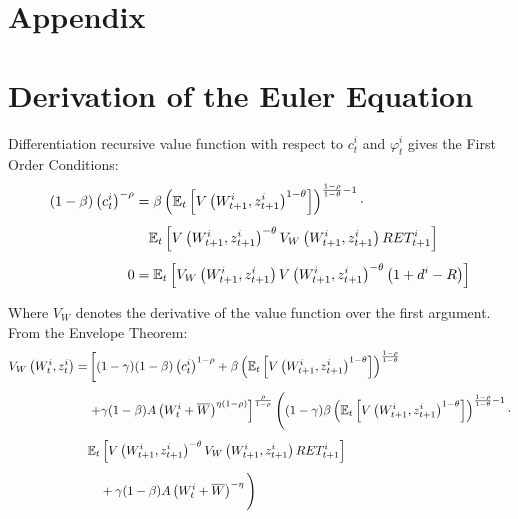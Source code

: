 \documentclass[12pt]{article}
\begin{document}
\printbibliography[title={Bibliography}]

\appendix
\section*{Appendix}
\section{Derivation of the Euler Equation}
\label{app:euler}

Differentiation recursive value function with respect to $c_t^i$ and $\varphi_t^i$ gives the First Order Conditions:
\begin{align}
(1 - \beta) \left(c_t^i\right)^{-\rho} 
&= \beta 
\left( 
    \mathbb{E}_t \left[ V\left(W_{t+1}^i, z_{t+1}^i\right)^{1 - \theta} \right] 
\right)^{\frac{1 - \rho}{1 - \theta} - 1} \cdot \notag \\[1ex]
&\quad 
\mathbb{E}_t \left[ 
    V\left(W_{t+1}^i, z_{t+1}^i\right)^{-\theta} 
    V_W\left(W_{t+1}^i, z_{t+1}^i\right) 
    RET_{t+1}^i 
\right] \label{eq:euler_main} \\[1ex]
0 &= 
\mathbb{E}_t \left[ 
    V_W\left(W_{t+1}^i, z_{t+1}^i\right) 
    V\left(W_{t+1}^i, z_{t+1}^i\right)^{-\theta} 
    \left( 1 + d^i - R \right) 
\right] \label{eq:euler_risky}
\end{align}

Where $V_W$ denotes the derivative of the value function over the first argument. From the Envelope Theorem:
\begin{align}
V_W\left(W_t^i, z_t^i\right) = 
&\left[
    (1 - \gamma)(1 - \beta) \left(c_t^i\right)^{1 - \rho} 
    + \beta 
    \left( \mathbb{E}_t \left[ V\left(W_{t+1}^i, z_{t+1}^i\right)^{1 - \theta} \right] \right)^{\frac{1 - \rho}{1 - \theta}} \right. \notag \\[1ex]
&\left. 
    + \gamma (1 - \beta) A\left(W_t^i + \overline{W}\right)^{\eta (1 - \rho)} 
\right]^{\frac{\rho}{1 - \rho}} \Bigg(
    (1 - \gamma) \beta 
    \left( \mathbb{E}_t \left[ V\left(W_{t+1}^i, z_{t+1}^i\right)^{1 - \theta} \right] \right)^{\frac{1 - \rho}{1 - \theta} - 1} \cdot \notag \\[1ex]
&    \mathbb{E}_t \left[ 
        V\left(W_{t+1}^i, z_{t+1}^i\right)^{-\theta} 
        V_W\left(W_{t+1}^i, z_{t+1}^i\right) 
        RET_{t+1}^i 
    \right] \notag \\[1ex]
&\quad + \gamma (1 - \beta) A\left(W_t^i + \overline{W} \right)^{-\eta}
\Bigg) \label{eq:envelope}
\end{align}
\end{document}
